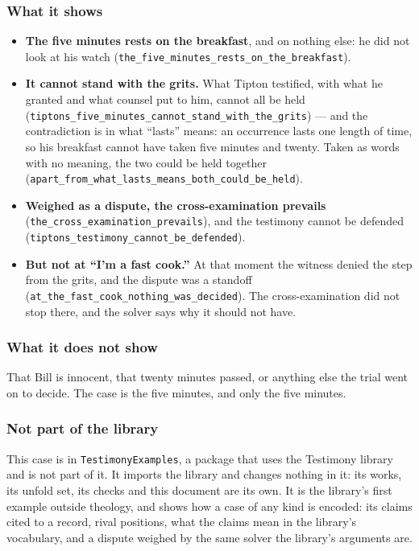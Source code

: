 \documentclass[11pt]{article}
\begin{document}
\subsubsection*{What it shows}
\begin{itemize}
  \item \textbf{The five minutes rests on the breakfast}, and on nothing else: he did not look at his watch (\texttt{the\_\allowbreak{}five\_\allowbreak{}minutes\_\allowbreak{}rests\_\allowbreak{}on\_\allowbreak{}the\_\allowbreak{}breakfast}).
  \item \textbf{It cannot stand with the grits.} What Tipton testified, with what he granted and what counsel put to him, cannot all be held (\texttt{tiptons\_\allowbreak{}five\_\allowbreak{}minutes\_\allowbreak{}cannot\_\allowbreak{}stand\_\allowbreak{}with\_\allowbreak{}the\_\allowbreak{}grits}) — and the contradiction is in what “lasts” means: an occurrence lasts one length of time, so his breakfast cannot have taken five minutes and twenty. Taken as words with no meaning, the two could be held together (\texttt{apart\_\allowbreak{}from\_\allowbreak{}what\_\allowbreak{}lasts\_\allowbreak{}means\_\allowbreak{}both\_\allowbreak{}could\_\allowbreak{}be\_\allowbreak{}held}).
  \item \textbf{Weighed as a dispute, the cross-examination prevails} (\texttt{the\_\allowbreak{}cross\_\allowbreak{}examination\_\allowbreak{}prevails}), and the testimony cannot be defended (\texttt{tiptons\_\allowbreak{}testimony\_\allowbreak{}cannot\_\allowbreak{}be\_\allowbreak{}defended}).
  \item \textbf{But not at “I’m a fast cook.”} At that moment the witness denied the step from the grits, and the dispute was a standoff (\texttt{at\_\allowbreak{}the\_\allowbreak{}fast\_\allowbreak{}cook\_\allowbreak{}nothing\_\allowbreak{}was\_\allowbreak{}decided}). The cross-examination did not stop there, and the solver says why it should not have.
\end{itemize}
\subsubsection*{What it does not show}
That Bill is innocent, that twenty minutes passed, or anything else the trial went on to decide. The case is the five minutes, and only the five minutes.

\subsubsection*{Not part of the library}
This case is in \texttt{Testimony\allowbreak{}Examples}, a package that uses the Testimony library and is not part of it. It imports the library and changes nothing in it: its works, its unfold set, its checks and this document are its own. It is the library’s first example outside theology, and shows how a case of any kind is encoded: its claims cited to a record, rival positions, what the claims mean in the library’s vocabulary, and a dispute weighed by the same solver the library’s arguments are.
\end{document}
